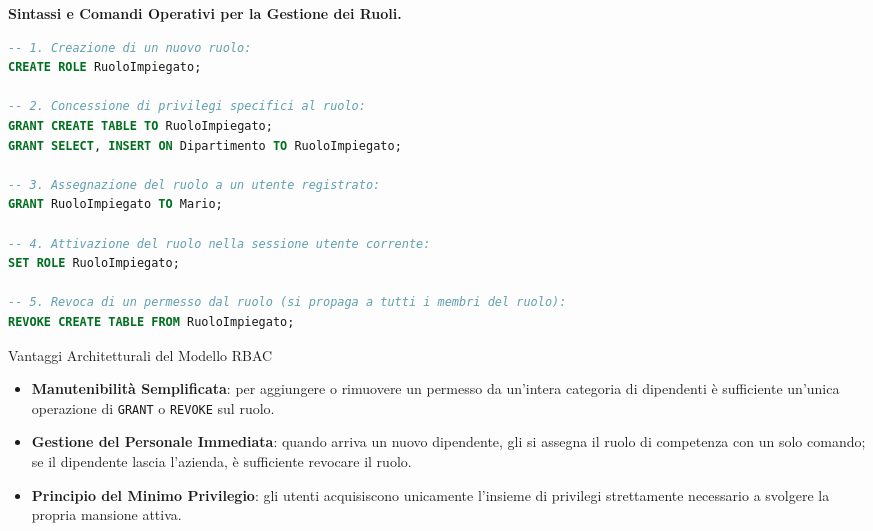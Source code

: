\documentclass[12pt]{extarticle}
\begin{document}
\begin{center}
\begin{adjustbox}{max width=\linewidth}
\end{adjustbox}
\end{center}

\medskip
\noindent \textbf{Sintassi e Comandi Operativi per la Gestione dei Ruoli.}
\begin{lstlisting}[language=SQL, caption={Flusso operativo completo con RBAC}]
-- 1. Creazione di un nuovo ruolo:
CREATE ROLE RuoloImpiegato;

-- 2. Concessione di privilegi specifici al ruolo:
GRANT CREATE TABLE TO RuoloImpiegato;
GRANT SELECT, INSERT ON Dipartimento TO RuoloImpiegato;

-- 3. Assegnazione del ruolo a un utente registrato:
GRANT RuoloImpiegato TO Mario;

-- 4. Attivazione del ruolo nella sessione utente corrente:
SET ROLE RuoloImpiegato;

-- 5. Revoca di un permesso dal ruolo (si propaga a tutti i membri del ruolo):
REVOKE CREATE TABLE FROM RuoloImpiegato;
\end{lstlisting}

\begin{cbox}{Vantaggi Architetturali del Modello RBAC}
\begin{itemize}
    \item \textbf{Manutenibilità Semplificata}: per aggiungere o rimuovere un permesso da un'intera categoria di dipendenti è sufficiente un'unica operazione di \texttt{GRANT} o \texttt{REVOKE} sul ruolo.
    \item \textbf{Gestione del Personale Immediata}: quando arriva un nuovo dipendente, gli si assegna il ruolo di competenza con un solo comando; se il dipendente lascia l'azienda, è sufficiente revocare il ruolo.
    \item \textbf{Principio del Minimo Privilegio}: gli utenti acquisiscono unicamente l'insieme di privilegi strettamente necessario a svolgere la propria mansione attiva.
\end{itemize}
\end{cbox}
\end{document}
